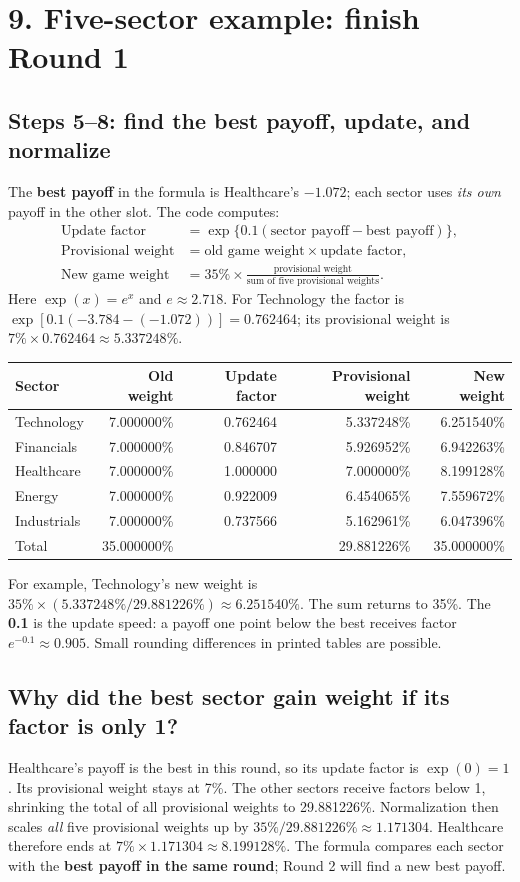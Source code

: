 \documentclass[11pt,letterpaper]{article}
\newcommand{\topic}[1]{\Needspace{5\baselineskip}\subsection*{#1}}
\newcommand{\word}[1]{\text{#1}}
\newcommand{\guidepage}[1]{\clearpage\section*{#1}}
\begin{document}
\guidepage{9. Five-sector example: finish Round 1}
\topic{Steps 5--8: find the best payoff, update, and normalize}
The \textbf{best payoff} in the formula is Healthcare's $-1.072$; each sector uses \emph{its own} payoff in the other slot. The code computes:
\[
\begin{aligned}
\word{Update factor}&=\exp\{0.1(\word{sector payoff}-\word{best payoff})\},\\
\word{Provisional weight}&=\word{old game weight}\times\word{update factor},\\
\word{New game weight}&=35\%\times
\frac{\word{provisional weight}}{\word{sum of five provisional weights}}.
\end{aligned}
\]
Here $\exp(x)=e^x$ and $e\approx2.718$. For Technology the factor is $\exp[0.1(-3.784-(-1.072))]=0.762464$; its provisional weight is $7\%\times0.762464\approx5.337248\%$.
\begin{center}
\small
\begin{tabular}{@{}lrrrr@{}}
\toprule
Sector & Old weight & Update factor & Provisional weight & New weight\\
\midrule
Technology & 7.000000\% & 0.762464 & 5.337248\% & 6.251540\%\\
Financials & 7.000000\% & 0.846707 & 5.926952\% & 6.942263\%\\
Healthcare & 7.000000\% & 1.000000 & 7.000000\% & 8.199128\%\\
Energy & 7.000000\% & 0.922009 & 6.454065\% & 7.559672\%\\
Industrials & 7.000000\% & 0.737566 & 5.162961\% & 6.047396\%\\
\midrule
Total & 35.000000\% & & 29.881226\% & 35.000000\%\\
\bottomrule
\end{tabular}
\end{center}
For example, Technology's new weight is $35\%\times(5.337248\%/29.881226\%)\approx6.251540\%$. The sum returns to 35\%. The \textbf{0.1} is the update speed: a payoff one point below the best receives factor $e^{-0.1}\approx0.905$. Small rounding differences in printed tables are possible.

\topic{Why did the best sector gain weight if its factor is only 1?}
Healthcare's payoff is the best in this round, so its update factor is $\exp(0)=1$. Its provisional weight stays at 7\%. The other sectors receive factors below 1, shrinking the total of all provisional weights to 29.881226\%. Normalization then scales \emph{all} five provisional weights up by $35\%/29.881226\%\approx1.171304$. Healthcare therefore ends at $7\%\times1.171304\approx8.199128\%$. The formula compares each sector with the \textbf{best payoff in the same round}; Round 2 will find a new best payoff.
\end{document}
